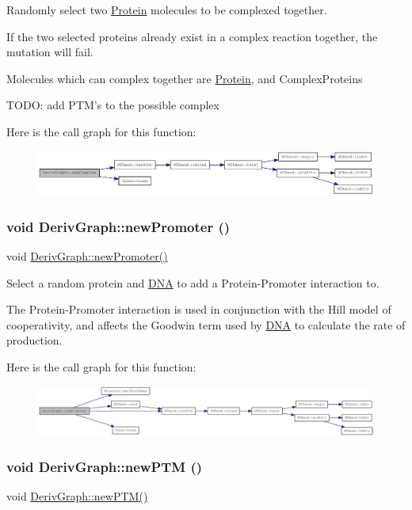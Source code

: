 Randomly select two \hyperlink{classProtein}{Protein} molecules to be complexed together.

If the two selected proteins already exist in a complex reaction together, the mutation will fail.

Molecules which can complex together are \hyperlink{classProtein}{Protein}, and ComplexProteins

TODO: add PTM's to the possible complex 

Here is the call graph for this function:\nopagebreak
\begin{figure}[H]
\begin{center}
\leavevmode
\includegraphics[width=420pt]{classDerivGraph_a4be722e989002430ca7c363dce500638_cgraph}
\end{center}
\end{figure}
\hypertarget{classDerivGraph_aa55a36103c33d4f1bd57de797bcd45cb}{
\subsubsection[{newPromoter}]{\setlength{\rightskip}{0pt plus 5cm}void DerivGraph::newPromoter ()}}
\label{classDerivGraph_aa55a36103c33d4f1bd57de797bcd45cb}
void \hyperlink{classDerivGraph_aa55a36103c33d4f1bd57de797bcd45cb}{DerivGraph::newPromoter()}

Select a random protein and \hyperlink{classDNA}{DNA} to add a Protein-\/Promoter interaction to.

The Protein-\/Promoter interaction is used in conjunction with the Hill model of cooperativity, and affects the Goodwin term used by \hyperlink{classDNA}{DNA} to calculate the rate of production. 

Here is the call graph for this function:\nopagebreak
\begin{figure}[H]
\begin{center}
\leavevmode
\includegraphics[width=420pt]{classDerivGraph_aa55a36103c33d4f1bd57de797bcd45cb_cgraph}
\end{center}
\end{figure}
\hypertarget{classDerivGraph_a83937a5c3ed427ebaad2bf23260c0352}{
\subsubsection[{newPTM}]{\setlength{\rightskip}{0pt plus 5cm}void DerivGraph::newPTM ()}}
\label{classDerivGraph_a83937a5c3ed427ebaad2bf23260c0352}
void \hyperlink{classDerivGraph_a83937a5c3ed427ebaad2bf23260c0352}{DerivGraph::newPTM()}

